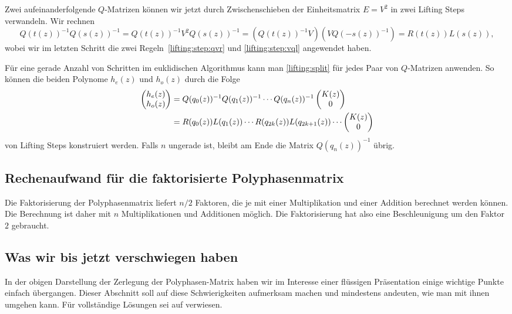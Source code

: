 Zwei aufeinanderfolgende $Q$-Matrizen können wir jetzt durch Zwischenschieben
der Einheitsmatrix $E=V^2$ in zwei Lifting Steps verwandeln.
Wir rechnen
\begin{equation}
Q(t(z))^{-1}Q(s(z))^{-1}
=
Q(t(z))^{-1}V^2Q(s(z))^{-1}
=
(Q(t(z))^{-1}V)(VQ(-s(z))^{-1})
=
R(t(z)) L(s(z)),
\label{lifting:split}
\end{equation}
wobei wir im letzten Schritt die zwei Regeln~\eqref{lifting:step:qvr}
und \eqref{lifting:step:vql} angewendet haben.

Für eine gerade Anzahl von Schritten im euklidischen Algorithmus 
kann man \eqref{lifting:split} für jedes Paar von $Q$-Matrizen anwenden.
So können die beiden Polynome $h_e(z)$ und $h_o(z)$ durch die Folge
\begin{align}
\begin{pmatrix} h_e(z)\\h_o(z)\end{pmatrix}
&=
Q(q_0(z))^{-1}
Q(q_1(z))^{-1}
\cdots
Q(q_n(z))^{-1}
\begin{pmatrix}K(z)\\ 0 \end{pmatrix}
\notag
\\
&=
R(q_0(z)) L(q_1(z)) \cdots R(q_{2k}(z)) L(q_{2k+1}(z)) \cdots 
\begin{pmatrix}K(z)\\ 0 \end{pmatrix}
\label{lifting:faktorisierung}
\end{align}
von Lifting Steps konstruiert werden.
Falls $n$ ungerade ist, bleibt am Ende die Matrix $Q(q_n(z))^{-1}$
übrig.

\subsection{Rechenaufwand für die faktorisierte Polyphasenmatrix}
Die Faktorisierung der Polyphasenmatrix liefert $n/2$ Faktoren,
die je mit einer Multiplikation und einer Addition berechnet werden
können.
Die Berechnung ist daher mit $n$ Multiplikationen und Additionen
möglich.
Die Faktorisierung hat also eine Beschleunigung um den Faktor $2$ 
gebraucht.

\subsection{Was wir bis jetzt verschwiegen haben
\label{lifting:verschwiegen}}
In der obigen Darstellung der Zerlegung der Polyphasen-Matrix 
haben wir im Interesse einer flüssigen Präsentation einige
wichtige Punkte einfach übergangen.
Dieser Abschnitt soll auf diese Schwierigkeiten aufmerksam machen
und mindestens andeuten, wie man mit ihnen umgehen kann.
Für vollständige Lösungen sei auf \cite{fpga:Daubechies1998} verwiesen.

